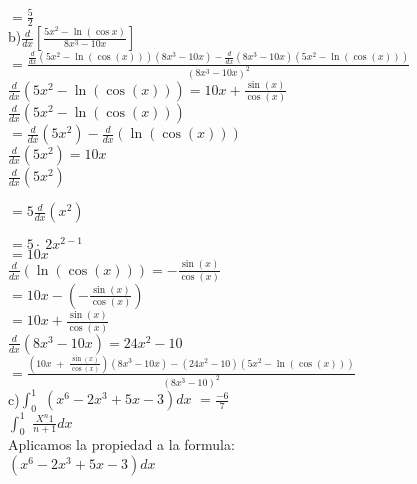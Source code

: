 \documentclass{report}%
\begin{document}
{{$=\displaystyle{\frac{5}{2}}$\\


b)$\frac{d}{dx} \left[ \frac{5x^2 - \ln (\cos x)}{8x^3 - 10x} \right]$ $=\frac{\frac{d}{dx}\left(5x^2-\ln \left(\cos \left(x\right)\right)\right)\left(8x^3-10x\right)-\frac{d}{dx}\left(8x^3-10x\right)\left(5x^2-\ln \left(\cos \left(x\right)\right)\right)}{\left(8x^3-10x\right)^2}$\\

$\frac{d}{dx}\left(5x^2-\ln \left(\cos \left(x\right)\right)\right)=10x+\frac{\sin \left(x\right)}{\cos \left(x\right)}$\\

$\frac{d}{dx}\left(5x^2-\ln \left(\cos \left(x\right)\right)\right)$\\

$=\frac{d}{dx}\left(5x^2\right)-\frac{d}{dx}\left(\ln \left(\cos \left(x\right)\right)\right)$\\

$\frac{d}{dx}\left(5x^2\right)=10x$\\

$\frac{d}{dx}\left(5x^2\right)$\

$=5\frac{d}{dx}\left(x^2\right)$

$=5\cdot \:2x^{2-1}$\\

$=10x$\\

$\frac{d}{dx}\left(\ln \left(\cos \left(x\right)\right)\right)=-\frac{\sin \left(x\right)}{\cos \left(x\right)}$\\

$=10x-\left(-\frac{\sin \left(x\right)}{\cos \left(x\right)}\right)$\\


$=10x+\frac{\sin \left(x\right)}{\cos \left(x\right)}$\\


$\frac{d}{dx}\left(8x^3-10x\right)=24x^2-10$\\

$=\frac{\left(10x\;+\;\frac{\sin\left(x\right)}{\cos\left(x\right)}\right)\left(8x^3-10x\right)-\left(24x^2-10\right)\left(5x^2-\ln\left(\cos\left(x\right)\right)\right)}{\left(8x^3-10\right)^2}$\\

c)$\displaystyle{\int_0^{1}}$ $(x^6-2x^3+5x-3)dx$ $ \displaystyle{=\frac{-6}{7} }$\\
$\displaystyle{\int_0^{1}}$
$\displaystyle{\frac{X^n1}{n+1}} dx$\\
Aplicamos la propiedad a la formula:\\
$(x^6-2x^3+5x-3)dx$ \\

}}
\end{document}
